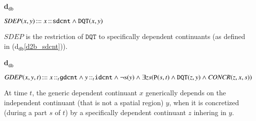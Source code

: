 \documentclass[ao]{iosart2x}
\newcommand{\bfoAxLabel}{\textrm{a$_\texttt{b}$}}
\newcommand{\dolceDefLabel}{\textrm{d$_\texttt{d}$}}
\newcommand{\dbDefLabel}{\textrm{d$_\texttt{db}$}}
\newcounter{cntdbdf}
\newcommand{\dbdf}[1]{\refstepcounter{cntdbdf}\begin{small}{\bf \dbDefLabel\thecntdbdf\label{#1}}\end{small}}
\newcommand{\refdolcedf}[1]{({\dolceDefLabel}\ref{#1})}
\newcommand{\refbfoax}[1]{({\bfoAxLabel}\ref{#1})}
\newcommand{\refdbdf}[1]{({\dbDefLabel}\ref{#1})}
\newcommand{\pr}[1]{\mathtt{#1}}
\newcommand{\prbfo}[1]{{\textit{{#1}}}}
\newcommand{\cn}[1]{\mathtt{#1}}
\newcommand\textequal{%
 \rule[.08ex]{5pt}{0.35pt}\llap{\rule[.78ex]{5pt}{0.35pt}}}
\newcommand{\sdef}{{\hspace{1.5pt}:\hspace{-2.5pt}\textequal\hspace{3pt}}}
\newcommand{\bfo}{{\textsc{bfo}}}
\newcommand {\Sdcat} {\textsc{s}}
\newcommand {\Pd} {\ensuremath{\pr{P}}}
\newcommand {\DQTd} {\ensuremath{\pr{DQT}}}
\newcommand {\SDd} {\ensuremath{\pr{SD}}}
\newcommand {\EXDd} {\ensuremath{\pr{EXD}}}
\newcommand{\idcntbcat}{\cn{idcnt}}
\newcommand{\gdcntbcat}{\cn{gdcnt}}
\newcommand{\sdcntbcat}{\cn{sdcnt}}
\newcommand{\procbcat}{\cn{proc}}
\newcommand{\bfocoverlap}{\prbfo{cO}}
\newcommand{\bfoiof}[1]{{\,::_{#1\:\!}}}
\newcommand{\bfosdep}{\prbfo{SDEP}}
\newcommand{\bfogdep}{\prbfo{GDEP}}
\newcommand{\bfoconcr}{\prbfo{CONCR}}
\begin{document}
\item[\dbdf{d2b_sdep}] $\bfosdep(x,y) \sdef x \bfoiof{} \sdcntbcat \land \DQTd(x,y)$

\vspace{1pt}
$\bfosdep$ is the restriction of $\DQTd$ to specifically dependent continuants (as defined in \refdbdf{d2b_sdcnt}).

%
%
%
%

\item[\dbdf{d2b_gdep}] $\bfogdep(x,y,t) \sdef x \bfoiof{t} \gdcntbcat \land y \bfoiof{t} \idcntbcat \land \neg\Sdcat(y) \land \exists zs(\Pd(s,t) \land \DQTd(z,y) \land \bfoconcr(z,x,s))$

\vspace{1pt}
At time $t$, the generic dependent continuant $x$ generically depends on the independent continuant (that is not a spatial region) $y$, when it is concretized (during a part $s$ of $t$) by a specifically dependent continuant $z$ inhering in $y$. 

%
\end{document}

